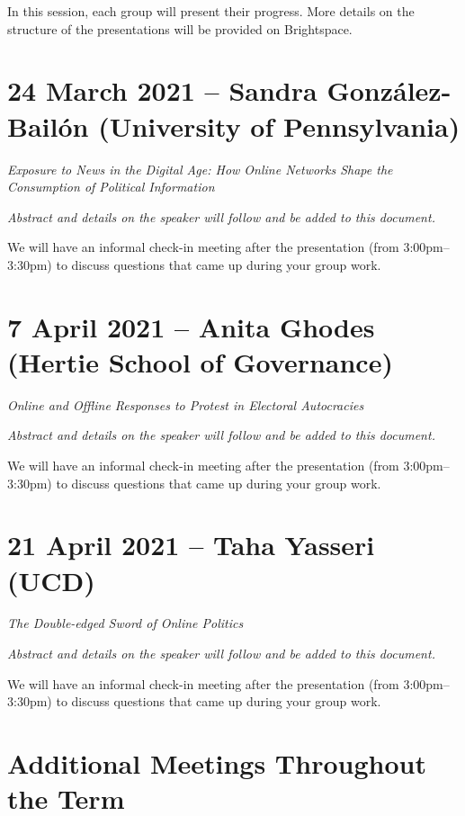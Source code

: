 \documentclass[abstract=on,parskip=full,headings=standardclasses,fontsize=11pt,paper=a4]{scrartcl}
\begin{document}
In this session, each group will present their progress. More details on the structure of the presentations will be provided on Brightspace.



\section{24 March 2021 -- Sandra González-Bailón (University of Pennsylvania)}


 \textit{Exposure to News in the Digital Age: How Online Networks Shape the Consumption of Political Information}
 
 \textit{Abstract and details on the speaker will follow and be added to this document.}

 
 We will have an informal check-in meeting after the presentation (from 3:00pm--3:30pm) to discuss questions that came up during your group work.
 
\section{7 April 2021 -- Anita Ghodes (Hertie School of Governance)}

 \textit{Online and Offline Responses to Protest in Electoral Autocracies}

\textit{Abstract and details on the speaker will follow and be added to this document.}


We will have an informal check-in meeting after the presentation (from 3:00pm--3:30pm) to discuss questions that came up during your group work.


\section{21 April 2021 -- Taha Yasseri (UCD)}


 \textit{The Double-edged Sword of Online Politics}

\textit{Abstract and details on the speaker will follow and be added to this document.}


We will have an informal check-in meeting after the presentation (from 3:00pm--3:30pm) to discuss questions that came up during your group work.




\section{Additional Meetings Throughout the Term}
\end{document}
